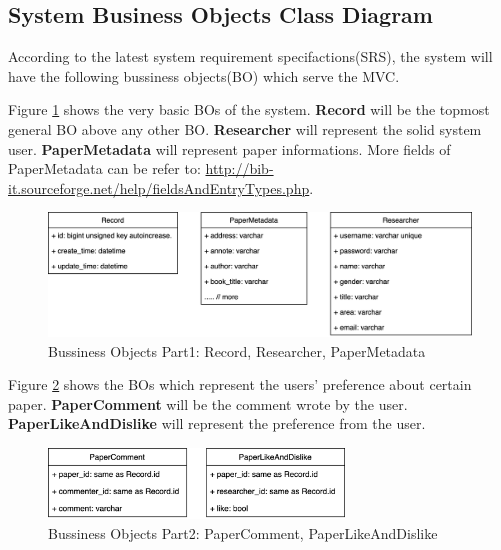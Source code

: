 \subsection{System Business Objects Class Diagram}

According to the latest system requirement specifactions(SRS), 
the system will have the following bussiness objects(BO) which serve the MVC.

Figure \ref{fig:bo_classes_1} shows the very basic BOs of the system. 
\textbf{Record} will be the topmost general BO above any other BO.
\textbf{Researcher} will represent the solid system user.
\textbf{PaperMetadata} will represent paper informations. 
More fields of PaperMetadata can be refer to:
\url{http://bib-it.sourceforge.net/help/fieldsAndEntryTypes.php}.


\begin{figure}[t]
	\centering
	\includegraphics[width=\textwidth]{./img/bo_classes_1.png}
	\caption{Bussiness Objects Part1: Record, Researcher, PaperMetadata}
	
	\label{fig:bo_classes_1}
\end{figure}


Figure \ref{fig:bo_classes_2} shows the BOs which represent the users' preference about certain paper. 
\textbf{PaperComment} will be the comment wrote by the user.
\textbf{PaperLikeAndDislike} will represent the preference from the user.

\begin{figure}[t]
	\centering
	\includegraphics[width=0.7\textwidth]{./img/bo_classes_2.png}
	\caption{Bussiness Objects Part2: PaperComment, PaperLikeAndDislike}
	
	\label{fig:bo_classes_2}
\end{figure}

